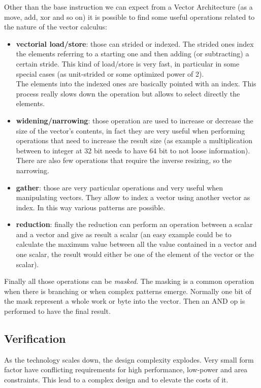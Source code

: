 Other than the base instruction we can expect from a Vector Architecture (as a move, add, xor and so on) it is possible to find some useful operations related to the nature of the vector calculus\cite{riscv-v-specs}:
\begin{itemize}
    \item \textbf{vectorial load/store}: those can strided or indexed. The strided ones index the elements referring to a starting one and then adding (or subtracting) a certain stride. This kind of load/store is very fast, in particular in some special cases (as unit-strided or some optimized power of 2).\\
    The elements into the indexed ones are basically pointed with an index. This process really slows down the operation but allows to select directly the elements.
    
    \item \textbf{widening/narrowing}: those operation are used to increase or decrease the size of the vector's contents, in fact they are very useful when performing operations that need to increase the result size (as example a multiplication between to integer at 32 bit needs to have 64 bit to not loose information). There are also few operations that require the inverse resizing, so the narrowing.
    
    \item \textbf{gather}: those are very particular operations and very useful when manipulating vectors. They allow to index a vector using another vector as index. In this way various patterns are possible.
    
    \item \textbf{reduction}: finally the reduction can perform an operation between a scalar and a vector and give as result a scalar (an easy example could be to calculate the maximum value between all the value contained in a vector and one scalar, the result would either be one of the element of the vector or the scalar).
    
\end{itemize}


Finally all those operations can be \textit{masked}. The masking is a common operation when there is branching or when complex patterns emerge.
Normally one bit of the mask represent a whole work or byte into the vector. Then an AND op is performed to have the final result. 

\subsection{Verification}
As the technology scales down, the design complexity explodes. 
Very small form factor have conflicting requirements for high performance, low-power and area constraints. 
This lead to a complex design and to elevate the costs of it.\\

